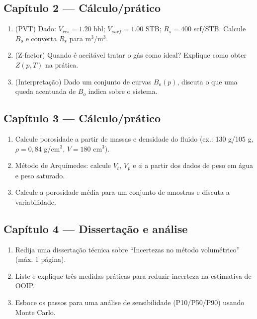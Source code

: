 \documentclass[11pt,a4paper]{article}
\begin{document}
\subsection{Capítulo 2 — Cálculo/prático}
\begin{enumerate}
\item (PVT) Dado: $V_{res}=1.20$ bbl; $V_{surf}=1.00$ STB; $R_s=400$ scf/STB. Calcule $B_o$ e converta $R_s$ para m$^3$/m$^3$.
\item (Z‑factor) Quando é aceitável tratar o gás como ideal? Explique como obter $Z(p,T)$ na prática.
\item (Interpretação) Dado um conjunto de curvas $B_o(p)$, discuta o que uma queda acentuada de $B_o$ indica sobre o sistema.
\end{enumerate}

\subsection{Capítulo 3 — Cálculo/prático}
\begin{enumerate}
\item Calcule porosidade a partir de massas e densidade do fluido (ex.: 130 g/105 g, $\rho=0{,}84$ g/cm$^3$, $V=180$ cm$^3$).
\item Método de Arquímedes: calcule $V_t$, $V_p$ e $\phi$ a partir dos dados de peso em água e peso saturado.
\item Calcule a porosidade média para um conjunto de amostras e discuta a variabilidade.
\end{enumerate}

\subsection{Capítulo 4 — Dissertação e análise}
\begin{enumerate}
\item Redija uma dissertação técnica sobre ``Incertezas no método volumétrico'' (máx. 1 página).
\item Liste e explique três medidas práticas para reduzir incerteza na estimativa de OOIP.
\item Esboce os passos para uma análise de sensibilidade (P10/P50/P90) usando Monte Carlo.
\end{enumerate}

\vspace{6mm}

\clearpage
\end{document}
